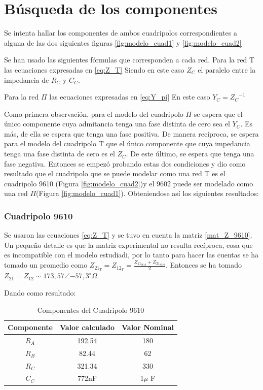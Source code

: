 \section{Búsqueda de los componentes}
Se intenta hallar los componentes de ambos cuadripolos correspondientes a alguna de las dos siguientes figuras \ref{fig:modelo_cuad1} y \ref{fig:modelo_cuad2}

Se han usado las siguientes fórmulas que corresponden a cada red.
Para la red T las ecuaciones expresadas en \ref{eq:Z_T}
Siendo en este caso $Z_C$ el paralelo entre la impedancia de $R_C$ y $C_C$.

Para la red $\Pi$ las ecuaciones expresadas en \ref{eq:Y_pi}
En este caso $Y_C = {Z_C}^{-1}$

Como primera observación, para el modelo del cuadripolo $\Pi$ se espera que el único componente cuya admitancia tenga una fase distinta de cero sea el $Y_C$. Es más, de ella se espera que tenga una fase positiva. De manera recíproca, se espera para el modelo del cuadripolo T que el único componente que cuya impedancia tenga una fase distinta de cero es el $Z_C$. De este último, se espera que tenga una fase negativa. 
Entonces se empezó probando estas dos condiciones y dio como resultado que el cuadripolo que se puede modelar como una red T es el cuadripolo 9610 (Figura \ref{fig:modelo_cuad2})y el 9602 puede ser modelado como una red $\Pi$(Figura \ref{fig:modelo_cuad1}). 
Obteniendose así los siguientes resultados:
\subsubsection{Cuadripolo 9610}
Se  usaron las ecuaciones \ref{eq:Z_T} y se tuvo en cuenta la matriz \ref{mat_Z_9610}. Un pequeño detalle es que la matriz experimental no resulta recíproca, cosa que es incompatible con el modelo estudiadi, por lo tanto para hacer las cuentas se ha tomado un promedio como $Z_{21_T} = Z_{12_T} = \frac{Z_{21_{9610}} + Z_{21_{9610}}} {2}$. Entonces se ha tomado $Z_{21} = Z_{12} \sim 173,57 \angle{-57,3} ^\circ \Omega$

Dando como resultado:

\begin{table}[H]
    \centering
    \begin{tabular}{|c|c|c|}
        \hline
        Componente & Valor calculado & Valor Nominal \\
        \hline
        $R_A$ & 192.54 & 180 \\
        $R_B$ & 82.44 & 62 \\
        $R_C$ & 321.34 & 330 \\
        $C_C$ & 772nF & 1$\mu$ F\\
        \hline
    \end{tabular}
    \caption{Componentes del Cuadripolo 9610}
    \label{tab:comp_9610}
\end{table}

